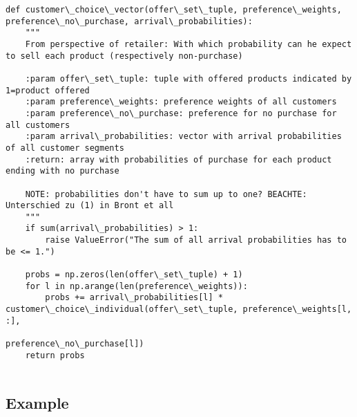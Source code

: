 \documentclass[11pt]{article}
\begin{document}
    \begin{Verbatim}[commandchars=\\\{\}]
def customer\_choice\_vector(offer\_set\_tuple, preference\_weights, preference\_no\_purchase, arrival\_probabilities):
    """
    From perspective of retailer: With which probability can he expect to sell each product (respectively non-purchase)

    :param offer\_set\_tuple: tuple with offered products indicated by 1=product offered
    :param preference\_weights: preference weights of all customers
    :param preference\_no\_purchase: preference for no purchase for all customers
    :param arrival\_probabilities: vector with arrival probabilities of all customer segments
    :return: array with probabilities of purchase for each product ending with no purchase

    NOTE: probabilities don't have to sum up to one? BEACHTE: Unterschied zu (1) in Bront et all
    """
    if sum(arrival\_probabilities) > 1:
        raise ValueError("The sum of all arrival probabilities has to be <= 1.")

    probs = np.zeros(len(offer\_set\_tuple) + 1)
    for l in np.arange(len(preference\_weights)):
        probs += arrival\_probabilities[l] * customer\_choice\_individual(offer\_set\_tuple, preference\_weights[l, :],
                                                                       preference\_no\_purchase[l])
    return probs


    \end{Verbatim}

    \subsection{Example}\label{example}
\end{document}
